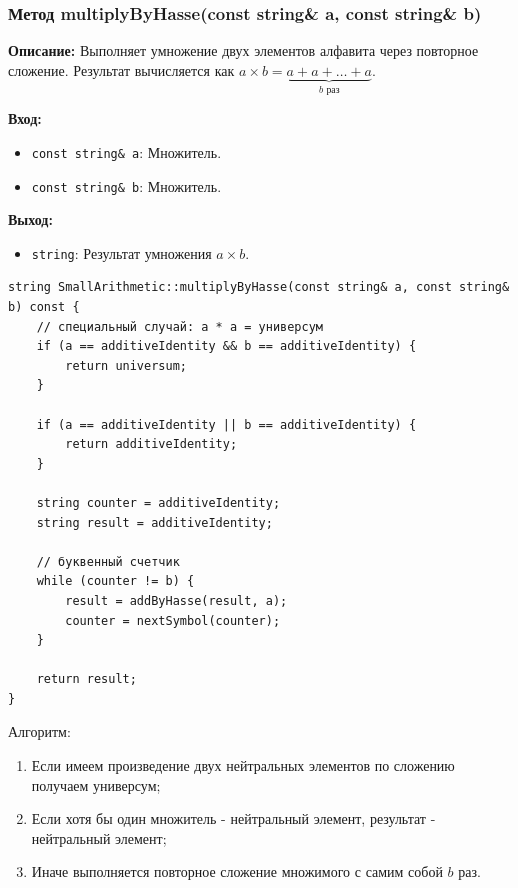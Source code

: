 \newpage

\subsubsection{Метод multiplyByHasse(const string\& a, const string\& b)}

\textbf{Описание:} Выполняет умножение двух элементов алфавита через повторное сложение. Результат вычисляется как $a \times b = \underbrace{a + a + \ldots + a}_{b \text{ раз}}$. 

\textbf{Вход:}
\begin{itemize}
    \item \texttt{const string\& a}:  Множитель.
    \item \texttt{const string\& b}:  Множитель.
\end{itemize}

\textbf{Выход:}
\begin{itemize}
    \item \texttt{string}: Результат умножения $a \times b$.
\end{itemize}

\begin{lstlisting}[style=cstyle, caption={Реализация multiplyByHasse()}]
string SmallArithmetic::multiplyByHasse(const string& a, const string& b) const {
    // специальный случай: a * a = универсум
    if (a == additiveIdentity && b == additiveIdentity) {
        return universum;
    }

    if (a == additiveIdentity || b == additiveIdentity) {
        return additiveIdentity;
    }

    string counter = additiveIdentity;
    string result = additiveIdentity;

    // буквенный счетчик
    while (counter != b) {
        result = addByHasse(result, a);
        counter = nextSymbol(counter);
    }

    return result;
}
\end{lstlisting}

Алгоритм: 
\begin{enumerate}
    \item Если имеем произведение двух нейтральных элементов по сложению получаем универсум;
    \item Если хотя бы один множитель - нейтральный элемент, результат - нейтральный элемент;
    \item Иначе выполняется повторное сложение множимого с самим собой $b$ раз. 
\end{enumerate}

